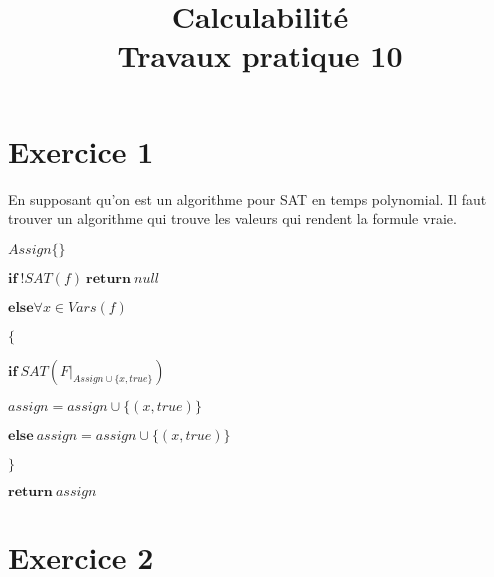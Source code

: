 \documentclass[11pt]{article}
\title{Calculabilité\\Travaux pratique 10}
\date{}
\begin{document}
\maketitle

\section{Exercice 1}

En supposant qu'on est un algorithme pour SAT en temps polynomial. Il faut trouver un algorithme qui trouve les valeurs qui rendent la formule vraie.

\begin{framed}
$Assign\{\}$

$\textbf{if}\ !SAT(f)\ \textbf{return}\ null$

$\textbf{else} \forall x \in Vars(f)$

$\{$

$\textbf{if}\ SAT(F|_{Assign\cup \{x, true\}})$

$assign = assign \cup \{(x,true)\}$

$\textbf{else}\ assign = assign \cup \{(x,true)\}$

$\}$

$\textbf{return}\ assign$
\end{framed}

\section{Exercice 2}
\end{document}
